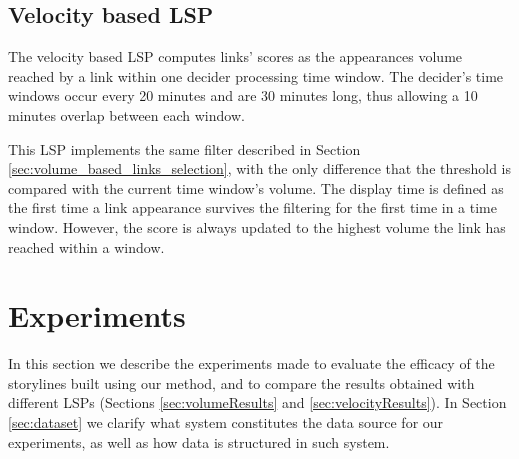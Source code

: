 \documentclass{sig-alternate}
\begin{document}
\subsection{Velocity based LSP}
\label{sec:velocity_based_links_selection}
The velocity based LSP computes links' scores as the appearances volume reached by a link within one decider processing time window. The decider's time windows occur every 20 minutes and are 30 minutes long, thus allowing a 10 minutes overlap between each window.

This LSP implements the same filter described in Section \ref{sec:volume_based_links_selection}, with the only difference that the threshold is compared with the current time window's volume. The display time is defined as the first time a link appearance survives the filtering for the first time in a time window. However, the score is always updated to the highest volume the link has reached within a window.


\section{Experiments}
\label{sec:experiment}
In this section we describe the experiments made to evaluate the efficacy of the storylines built using our method, and to compare the results obtained with different LSPs (Sections \ref{sec:volumeResults} and \ref{sec:velocityResults}). In Section \ref{sec:dataset} we clarify what system constitutes the data source for our experiments, as well as how data is structured in such system.
\end{document}
